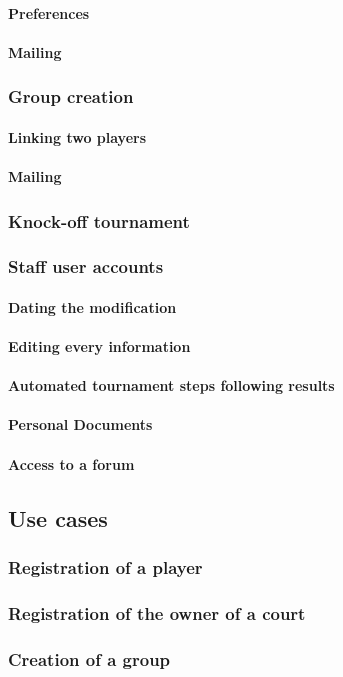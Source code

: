 \paragraph{Preferences}
\paragraph{Mailing}

\subsubsection{Group creation}

\paragraph{Linking two players}
\paragraph{Mailing}

\subsubsection{Knock-off tournament}
\subsubsection{Staff user accounts}

\paragraph{Dating the modification}
\paragraph{Editing every information}
\paragraph{Automated tournament steps following results}
\paragraph{Personal Documents}
\paragraph{Access to a forum}

\subsection{Use cases}
\subsubsection{Registration of a player}
\subsubsection{Registration of the owner of a court}
\subsubsection{Creation of a group}
